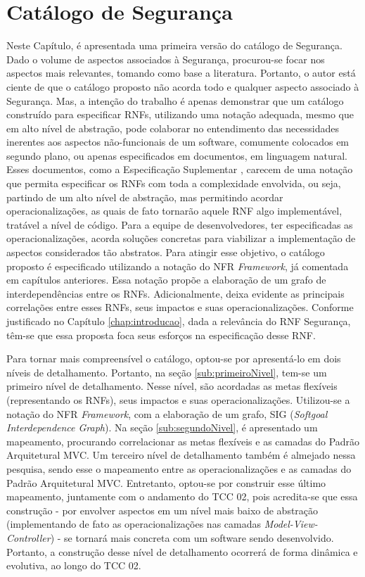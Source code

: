 \chapter{Catálogo de Segurança}
\label{chap:proposta}

Neste Capítulo, é apresentada uma primeira versão do catálogo de Segurança. Dado o volume de aspectos associados à Segurança, procurou-se focar nos aspectos mais relevantes, tomando como base a literatura. Portanto, o autor está ciente de que o catálogo proposto não acorda todo e qualquer aspecto associado à Segurança. Mas, a intenção do trabalho é apenas demonstrar que um catálogo construído para especificar RNFs, utilizando uma notação adequada, mesmo que em alto nível de abstração, pode colaborar no entendimento das necessidades inerentes aos aspectos não-funcionais de um software, comumente colocados em segundo plano, ou apenas especificados em documentos, em linguagem natural. Esses documentos, como a Especificação Suplementar \cite{sommerville1997requirements}, carecem de uma notação que permita especificar os RNFs com toda a complexidade envolvida, ou seja, partindo de  um alto nível de abstração, mas permitindo acordar operacionalizações, as quais de fato tornarão aquele RNF algo implementável, tratável a nível de código. Para a equipe de desenvolvedores, ter especificadas as operacionalizações, acorda soluções concretas para viabilizar a implementação de aspectos considerados tão abstratos. Para atingir esse objetivo, o catálogo proposto é especificado utilizando a notação do NFR \textit{Framework}, já comentada em capítulos anteriores. Essa notação propõe a elaboração de um grafo de interdependências entre os RNFs. Adicionalmente, deixa evidente as principais correlações entre esses RNFs, seus impactos e suas operacionalizações. Conforme justificado no Capítulo \ref{chap:introducao}, dada a relevância do RNF Segurança, têm-se que essa proposta foca seus esforços na especificação desse RNF.

Para tornar mais compreensível o catálogo, optou-se por apresentá-lo em dois níveis de detalhamento. Portanto, na seção \ref{sub:primeiroNivel}, tem-se um primeiro nível de detalhamento. Nesse nível, são acordadas as metas flexíveis (representando os RNFs), seus impactos e suas operacionalizações. Utilizou-se a notação do NFR \textit{Framework}, com a elaboração de um grafo, SIG (\textit{Softgoal Interdependence Graph}). Na seção \ref{sub:segundoNivel}, é apresentado um mapeamento, procurando correlacionar as metas flexíveis e as camadas do Padrão Arquitetural MVC. Um terceiro nível de detalhamento também é almejado nessa pesquisa, sendo esse o mapeamento entre as operacionalizações e as camadas do Padrão Arquitetural MVC. Entretanto, optou-se por construir esse último mapeamento, juntamente com o andamento do TCC 02, pois acredita-se que essa construção - por envolver aspectos em um nível mais baixo de abstração (implementando de fato as operacionalizações nas camadas \textit{Model-View-Controller}) - se tornará mais concreta com um software sendo desenvolvido. Portanto, a construção desse nível de detalhamento ocorrerá de forma dinâmica e evolutiva, ao longo do TCC 02.

